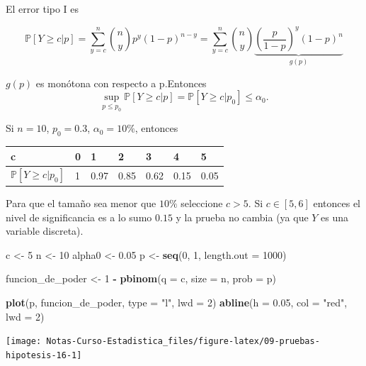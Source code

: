 \documentclass[
  12pt,
]{book}
\newenvironment{Shaded}{\begin{snugshade}}{\end{snugshade}}
\newcommand{\DataTypeTok}[1]{\textcolor[rgb]{0.13,0.29,0.53}{#1}}
\newcommand{\DecValTok}[1]{\textcolor[rgb]{0.00,0.00,0.81}{#1}}
\newcommand{\FloatTok}[1]{\textcolor[rgb]{0.00,0.00,0.81}{#1}}
\newcommand{\KeywordTok}[1]{\textcolor[rgb]{0.13,0.29,0.53}{\textbf{#1}}}
\newcommand{\NormalTok}[1]{#1}
\newcommand{\OperatorTok}[1]{\textcolor[rgb]{0.81,0.36,0.00}{\textbf{#1}}}
\newcommand{\StringTok}[1]{\textcolor[rgb]{0.31,0.60,0.02}{#1}}
\begin{document}
El error tipo I es

\[\mathbb P[Y\geq c|p] = \sum_{y=c}^n{n\choose y}p^y(1-p)^{n-y} = \sum_{y=c}^n{n\choose y} \underbrace{\left(\dfrac p{1-p}\right)^y(1-p)^n}_{g(p)}\]

\(g(p)\) es monótona con respecto a p.Entonces
\[\sup_{p\leq p_0} \mathbb P[Y\geq c|p] = \mathbb P [Y\geq c|p_0] \leq \alpha_0.\]

Si \(n=10\), \(p_0 = 0.3\), \(\alpha_0 = 10\%\), entonces

\begin{longtable}[]{@{}lllllll@{}}
\toprule
c & 0 & 1 & 2 & 3 & 4 & 5\tabularnewline
\midrule
\endhead
\(\mathbb P[Y\geq c|p_0]\) & 1 & 0.97 & 0.85 & 0.62 & 0.15 & 0.05\tabularnewline
\bottomrule
\end{longtable}

Para que el tamaño sea menor que \(10\%\) seleccione \(c>5\). Si \(c\in [5,6]\)
entonces el nivel de significancia es a lo sumo \(0.15\) y la prueba no cambia (ya
que \(Y\) es una variable discreta).

\begin{Shaded}
\begin{Highlighting}[]
\NormalTok{c \textless{}{-}}\StringTok{ }\DecValTok{5}
\NormalTok{n \textless{}{-}}\StringTok{ }\DecValTok{10}
\NormalTok{alpha0 \textless{}{-}}\StringTok{ }\FloatTok{0.05}
\NormalTok{p \textless{}{-}}\StringTok{ }\KeywordTok{seq}\NormalTok{(}\DecValTok{0}\NormalTok{, }\DecValTok{1}\NormalTok{, }\DataTypeTok{length.out =} \DecValTok{1000}\NormalTok{)}

\NormalTok{funcion\_de\_poder \textless{}{-}}\StringTok{ }\DecValTok{1} \OperatorTok{{-}}\StringTok{ }\KeywordTok{pbinom}\NormalTok{(}\DataTypeTok{q =}\NormalTok{ c, }\DataTypeTok{size =}\NormalTok{ n, }\DataTypeTok{prob =}\NormalTok{ p)}

\KeywordTok{plot}\NormalTok{(p, funcion\_de\_poder, }\DataTypeTok{type =} \StringTok{"l"}\NormalTok{, }\DataTypeTok{lwd =} \DecValTok{2}\NormalTok{)}
\KeywordTok{abline}\NormalTok{(}\DataTypeTok{h =} \FloatTok{0.05}\NormalTok{, }\DataTypeTok{col =} \StringTok{"red"}\NormalTok{, }\DataTypeTok{lwd =} \DecValTok{2}\NormalTok{)}
\end{Highlighting}
\end{Shaded}

\begin{center}\texttt{[image: Notas-Curso-Estadistica\_files/figure-latex/09-pruebas-hipotesis-16-1]} \end{center}
\end{document}
